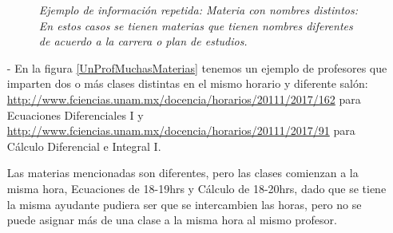 \begin{itemize}
\begin{figure}[H]
	\centering
	\caption[\textit{Ejemplo de información repetida: Materia con nombres distintos}]{\textit{Ejemplo de información repetida: Materia con nombres distintos: En estos casos se tienen materias que tienen nombres diferentes de acuerdo a la carrera o plan de estudios.}}\label{MateriaNombresDistintos}
\end{figure}


\item[-] En la figura \ref{UnProfMuchasMaterias} tenemos un ejemplo de profesores que imparten dos o más clases distintas en el mismo horario y diferente salón: \url{http://www.fciencias.unam.mx/docencia/horarios/20111/2017/162} para Ecuaciones Diferenciales I y \url{http://www.fciencias.unam.mx/docencia/horarios/20111/2017/91} para Cálculo Diferencial e Integral I.
  
Las materias mencionadas son diferentes, pero las clases comienzan a la misma hora, Ecuaciones de 18-19hrs y Cálculo de 18-20hrs, dado que se tiene la misma ayudante pudiera ser que se intercambien las horas, pero no se puede asignar más de una clase a la misma hora al mismo profesor.




\end{itemize}
